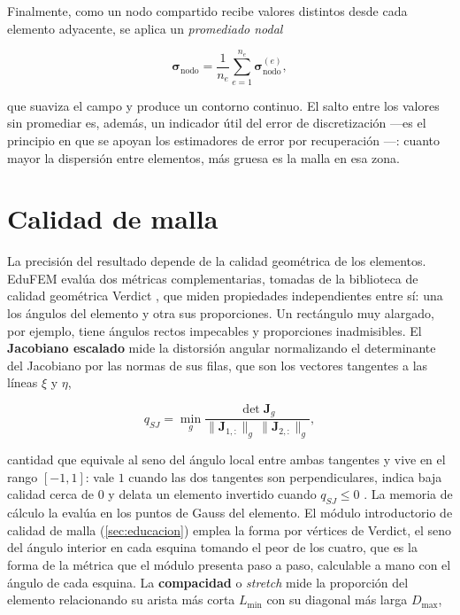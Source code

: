 Finalmente, como un nodo compartido recibe valores distintos desde cada elemento adyacente, se aplica un \emph{promediado nodal}

\begin{equation}
\bm{\sigma}_{\text{nodo}} = \frac{1}{n_e}\sum_{e=1}^{n_e} \bm{\sigma}_{\text{nodo}}^{(e)},
\label{eq:promediado}
\end{equation}

que suaviza el campo y produce un contorno continuo. El salto entre los valores sin promediar es, además, un indicador útil del error de discretización —es el principio en que se apoyan los estimadores de error por recuperación \autocite[pp.~476-477]{zienkiewicz2013fem}—: cuanto mayor la dispersión entre elementos, más gruesa es la malla en esa zona.

\section{Calidad de malla}
\label{sec:calidad-malla}

La precisión del resultado depende de la calidad geométrica de los elementos. EduFEM evalúa dos métricas complementarias, tomadas de la biblioteca de calidad geométrica Verdict \autocite[p.~3]{stimpson2007verdict}, que miden propiedades independientes entre sí: una los ángulos del elemento y otra sus proporciones. Un rectángulo muy alargado, por ejemplo, tiene ángulos rectos impecables y proporciones inadmisibles. El \textbf{Jacobiano escalado} mide la distorsión angular normalizando el determinante del Jacobiano por las normas de sus filas, que son los vectores tangentes a las líneas $\xi$ y $\eta$,

\begin{equation}
q_{SJ} = \min_g \frac{\det\bm{J}_g}{\|\bm{J}_{1,:}\|_g\,\|\bm{J}_{2,:}\|_g},
\label{eq:scaled-jacobian}
\end{equation}

cantidad que equivale al seno del ángulo local entre ambas tangentes y vive en el rango $[-1, 1]$: vale $1$ cuando las dos tangentes son perpendiculares, indica baja calidad cerca de $0$ y delata un elemento invertido cuando $q_{SJ} \le 0$ \autocite[p.~51]{stimpson2007verdict}. La memoria de cálculo la evalúa en los puntos de Gauss del elemento. El módulo introductorio de calidad de malla (\autoref{sec:educacion}) emplea la forma por vértices de Verdict, el seno del ángulo interior en cada esquina tomando el peor de los cuatro, que es la forma de la métrica que el módulo presenta paso a paso, calculable a mano con el ángulo de cada esquina. La \textbf{compacidad} o \emph{stretch} mide la proporción del elemento relacionando su arista más corta $L_{\min}$ con su diagonal más larga $D_{\max}$,


